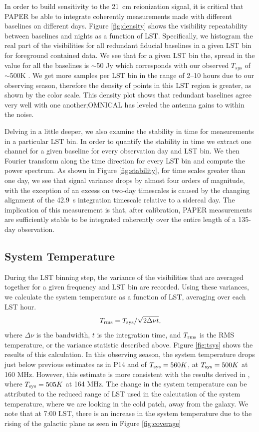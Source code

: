 \documentclass[twocolumn,numberedappendix]{emulateapj} \shorttitle{New Limits on the 21 cm Power Spectrum at $z=8.4$}
\newcommand{\Tsys}{T_{\rm sys}}
\begin{document}
In order to build sensitivity to the 21~cm reionization signal, it is critical
that PAPER be able to integrate coherently measurements made with different baselines on different days.
Figure \ref{fig:density} shows the visibility repeatability between 
baselines and nights as a function of LST. Specifically, we histogram the real part of
the visibilities for all redundant fiducial baselines 
in a given LST bin for foreground contained data. We see that for a
given LST bin the, spread in the value for all the baselines is $\sim$50 Jy which corresponds with our observed
$T_{sys}$ of $\sim$500K .  We get
more samples per LST bin in the range of 2--10 hours due to our observing
season, therefore the density of points in this LST region is greater, as shown by
the color scale. This density plot shows that redundant baselines agree very well
with one another;OMNICAL has leveled the antenna gains to within the noise.

Delving in a little deeper, we also examine the
stability in time for measurements in a particular LST bin. In order to quantify the stability
in time we extract one channel for a given baseline for every observation day
and LST bin. We then Fourier transform along the time direction for every LST
bin and compute the power spectrum. As shown in Figure \ref{fig:stability},
for time scales greater than one day, we see that signal variance drops by
almost four orders of magnitude, 
with the exception of an 
excess on two-day timescales is caused by the changing alignment of the 42.9~s
integration timescale relative to a sidereal day.  The implication of this measurement
is that, after calibration, PAPER measurements are sufficiently stable to be integrated
coherently over the entire length of a 135-day observation.

\subsection{System Temperature}   

During the LST binning step, the variance of the visibilities that are averaged
together for a given frequency and LST bin are recorded. Using these variances,
we calculate the system temperature as a function of LST, averaging over each
LST hour. 
\begin{equation}
    T_{\rm rms} = \Tsys/\sqrt{2\Delta\nu t}, 
\end{equation}
where $\Delta\nu$ is the bandwidth, $t$ is the integration time, and
$T_{\rm rms}$ is the RMS temperature, or the variance statistic described above.
Figure \ref{fig:tsys} shows the results of this calculation. In this observing
season, the system temperature drops just below previous estimates 
as in P14 and \citet{jacobs_et_al2014} of $\Tsys=560K$, at $\Tsys=500K$ at 160
MHz. However, this estimate is more consistent with the results derived in
\citep{moore_et_al2015}, where $\Tsys=505K$ at 164 MHz. The change in the
system temperature can be attributed to the reduced range of LST used in the
calcutation of the system temperature, where we are looking in the cold patch, away from the galaxy. We note that at 7:00 LST, there is an increase in the system temperature due to the rising of the galactic plane as seen in Figure \ref{fig:coverage}
\end{document}
